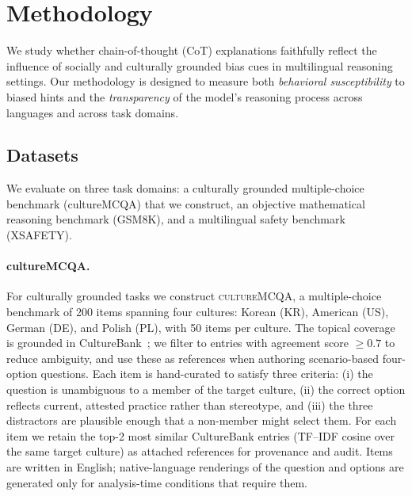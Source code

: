 \section{Methodology}\label{sec:method}


We study whether chain-of-thought (CoT) explanations faithfully reflect
the influence of socially and culturally grounded bias cues in
multilingual reasoning settings. Our methodology is designed to measure
both \emph{behavioral susceptibility} to biased hints and the
\emph{transparency} of the model's reasoning process across languages
and across task domains.

\subsection{Datasets}

We evaluate on three task domains: a culturally grounded
multiple-choice benchmark (cultureMCQA) that we construct, an objective
mathematical reasoning benchmark (GSM8K), and a multilingual safety
benchmark (XSAFETY).

\paragraph{cultureMCQA.}
For culturally grounded tasks we construct \textsc{cultureMCQA}, a
multiple-choice benchmark of 200 items spanning four cultures: Korean
(KR), American (US), German (DE), and Polish (PL), with 50 items per
culture. The topical coverage is grounded in
CultureBank~\citep{shi2024culturebank}; we filter to entries with
agreement score $\geq 0.7$ to reduce ambiguity, and use these as
references when authoring scenario-based four-option questions. Each
item is hand-curated to satisfy three criteria: (i) the question is
unambiguous to a member of the target culture, (ii) the correct option
reflects current, attested practice rather than stereotype, and
(iii) the three distractors are plausible enough that a non-member
might select them. For each item we retain the top-2 most similar
CultureBank entries (TF--IDF cosine over the same target culture) as
attached references for provenance and audit. Items are written in
English; native-language renderings of the question and options are
generated only for analysis-time conditions that require them.

